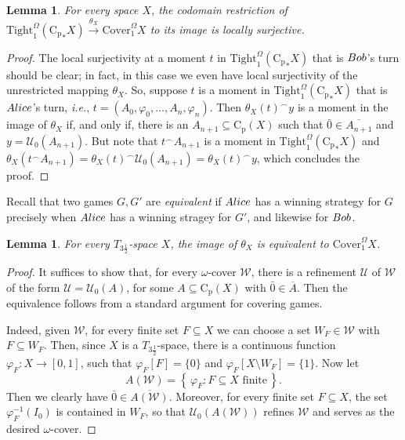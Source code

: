 \documentclass[12pt]{amsart}
\newtheorem{lemma}[thm]{Lemma}
\theoremstyle{definition}
\newcommand{\set}[1]{\left\{\, {#1} \,\right\}}
\newcommand{\seq}[1]{{\left( {#1} \right)}}
\newcommand{\W}{{\Omega}}
\newcommand{\ali}{\textup{\textmd{\textsc{Alice}}}}
\newcommand{\bob}{\textup{\textmd{\textsc{Bob}}}}
\newcommand{\Cp}{\mathrm{C}_{\mathrm {p}}}
\newcommand{\mU}{{\mathcal{U}}}
\newcommand{\mW}{{\mathcal{W}}}
\newcommand{\Tight}{\mathrm{Tight}}
\newcommand{\Cover}{\mathrm{Cover}}
\begin{document}
\begin{lemma}\label{LEMMA_thetaLocalSurj}
	For every space $X$, the codomain restriction of $\Tight^\Omega_1({\Cp}_*X)\stackrel{\theta_X}{\to} \Cover^\W_1X$ to its image is locally surjective.
\end{lemma}
\begin{proof}
	The local surjectivity at a moment $t$ in $\Tight^\Omega_1({\Cp}_*X)$ that is $\bob$'s turn should be clear; in fact, in this case we even have  local surjectivity of the unrestricted mapping $\theta_X$. 
	So, suppose $t$ is a moment in $\Tight^\Omega_1({\Cp}_*X)$ that is $\ali$'s turn, \textit{i.e.}, $t=\seq{A_0, \varphi_0, \dotsc, A_n, \varphi_n}$. Then $\theta_X(t)^\smallfrown y$ is a moment in the image of $\theta_X$ if, and only if, there is an $A_{n+1}\subseteq \Cp(X)$ such that $\bar{0}\in \overline{A_{n+1}}$ and $y=\mU_0(A_{n+1})$. But note that $t^\smallfrown A_{n+1}$ is a moment in $\Tight^\Omega_1({\Cp}_*X)$ and $\theta_X(t^\smallfrown A_{n+1})=\theta_X(t)^\smallfrown \mU_0(A_{n+1}) = \theta_X(t)^\smallfrown y$, which concludes the proof.
\end{proof}


Recall that two games $G,G'$ are \emph{equivalent} if $\ali$ has a winning strategy for $G$ precisely when $\ali$ has a winning stragey for $G'$, and likewise for $\bob$.


\begin{lemma}\label{LEMMA_thetaImgEqv}
	For every $T_{3\frac{1}{2}}$-space $X$, the image of $\theta_X$ is equivalent to $\Cover^\Omega_1X$. 
\end{lemma}
\begin{proof}
	It suffices to show that, for every $\omega$-cover $\mW$, there is a refinement $\mU$ of $\mW$ of the form $\mU=\mU_0(A)$, for some $A\subseteq \Cp(X)$ with $\bar{0}\in \overline{A}$. Then the equivalence follows from a standard argument for covering games.
	
	Indeed, given $\mW$, for every finite set $F\subseteq X$ we can choose a set $W_F\in \mW$ with $F\subseteq W_F$. Then, since $X$ is  a $T_{3\frac{1}{2}}$-space,		there is a continuous function $\varphi_F\colon X \to [0,1]$, such that $\varphi_F[F]=\{0\}$ and $\varphi_F[X\setminus W_F]=\{1\}$.
	Now let
	\[
	A(\mW)=\set{\varphi_F: F\subseteq X \text{ finite}}.
	\]
	Then we clearly have 
	$\bar{0}\in \overline{A(\mW)}$. Moreover, for every finite set $F\subseteq X$, the set $\varphi_F^{-1}(I_0)$ is contained in $W_F$, so that $\mU_0(A(\mW))$ refines $\mW$ and serves as the desired $\omega$-cover.
\end{proof}
\end{document}
